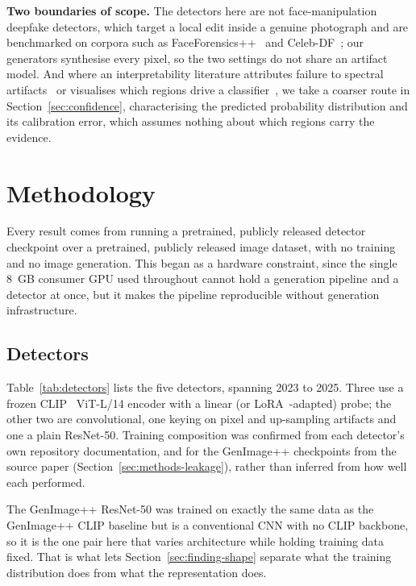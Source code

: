 \documentclass[3p,times,procedia]{elsarticle}
\begin{document}
\textbf{Two boundaries of scope.} The detectors here are not
face-manipulation deepfake detectors, which target a local edit inside a
genuine photograph and are benchmarked on corpora such as
FaceForensics++~\cite{rossler2019ff} and Celeb-DF~\cite{li2020celebdf};
our generators synthesise every pixel, so the two settings do not share an
artifact model. And where an interpretability literature attributes
failure to spectral artifacts~\cite{qian2020f3net,frank2020frequency} or
visualises which regions drive a classifier~\cite{selvaraju2017gradcam},
we take a coarser route in Section~\ref{sec:confidence}, characterising
the predicted probability distribution and its calibration error, which
assumes nothing about which regions carry the evidence.

\section{Methodology}
\label{sec:methods}

Every result comes from running a pretrained, publicly released detector
checkpoint over a pretrained, publicly released image dataset, with no
training and no image generation. This began as a hardware constraint,
since the single 8~GB consumer GPU used throughout cannot hold a
generation pipeline and a detector at once, but it makes the pipeline
reproducible without generation infrastructure.

\subsection{Detectors}

Table~\ref{tab:detectors} lists the five detectors, spanning 2023 to 2025.
Three use a frozen CLIP~\cite{radford2021clip} ViT-L/14 encoder with a
linear (or LoRA~\cite{hu2022lora}-adapted) probe; the other two are
convolutional, one keying on pixel and up-sampling artifacts and one a
plain ResNet-50. Training composition was confirmed from each detector's
own repository documentation, and for the GenImage++ checkpoints from the
source paper (Section~\ref{sec:methods-leakage}), rather than inferred
from how well each performed.

The GenImage++ ResNet-50 was trained on exactly the same data as the
GenImage++ CLIP baseline but is a conventional CNN with no CLIP backbone,
so it is the one pair here that varies architecture while holding training
data fixed. That is what lets Section~\ref{sec:finding-shape} separate
what the training distribution does from what the representation does.
\end{document}
